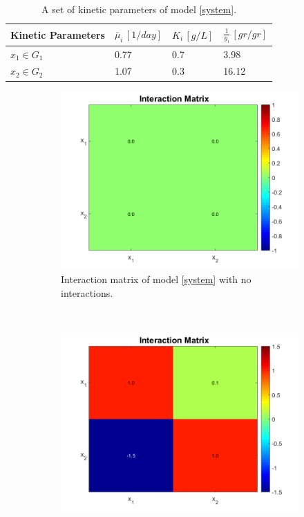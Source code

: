 \documentclass[3p,times]{article}
\begin{document}
\begin{table}[ht]
	\centering
	\begin{tabular}{|l|l|l|l|}
		\hline
		Kinetic Parameters & $\bar{\mu}_i\,[1/day]$ & $K_i\,[g/L]$ & $\frac{1}{y_i} \, [gr/gr]$ \\ \hline
		$x_1 \in G_1$ & 0.77  & 0.7 & 3.98  \\ \hline
		$x_2\in G_2$ & 1.07 & 0.3 &  16.12 \\ \hline
	\end{tabular}	
	\caption{A set of kinetic parameters of model \eqref{system}.}
	\label{kinetic_parameters_case_study_1}
\end{table}

\begin{figure}[h]
	\centering
	\begin{subfigure}[b]{0.45\textwidth}
		\includegraphics[width = \textwidth]{Stability/Interactions_case_study_1_no_interactions}
		\caption{Interaction matrix of model \eqref{system} with no interactions.}
		\label{case1_no_interactions}
	\end{subfigure}
	~
	\begin{subfigure}[b]{0.45\textwidth}
		\includegraphics[width = \textwidth]{Stability/Interactions_case_study_1}

\end{subfigure}
\end{figure}
\end{document}
